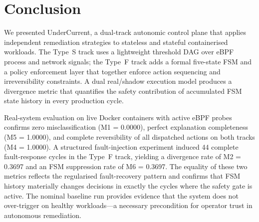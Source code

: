 \documentclass[runningheads]{llncs}
\begin{document}
\section{Conclusion}
\label{sec:conclusion}

We presented UnderCurrent, a dual-track autonomic control plane that
applies independent remediation strategies to stateless and stateful
containerised workloads. The Type~S track uses a lightweight threshold
DAG over eBPF process and network signals; the Type~F track adds a
formal five-state FSM and a policy enforcement layer that together
enforce action sequencing and irreversibility constraints. A dual
real/shadow execution model produces a divergence metric that quantifies
the safety contribution of accumulated FSM state history in every
production cycle.

Real-system evaluation on live Docker containers with active eBPF
probes confirms zero misclassification (M1 = 0.0000), perfect
explanation completeness (M5 = 1.0000), and complete reversibility of
all dispatched actions on both tracks (M4 = 1.0000). A structured
fault-injection experiment induced 44 complete fault-response cycles
in the Type~F track, yielding a divergence rate of M2 = 0.3697 and an
FSM suppression rate of M6 = 0.3697. The equality of these two
metrics reflects the regularised fault-recovery pattern and confirms
that FSM history materially changes decisions in exactly the cycles
where the safety gate is active. The nominal baseline run provides
evidence that the system does not over-trigger on healthy workloads---a
necessary precondition for operator trust in autonomous remediation.
\end{document}
